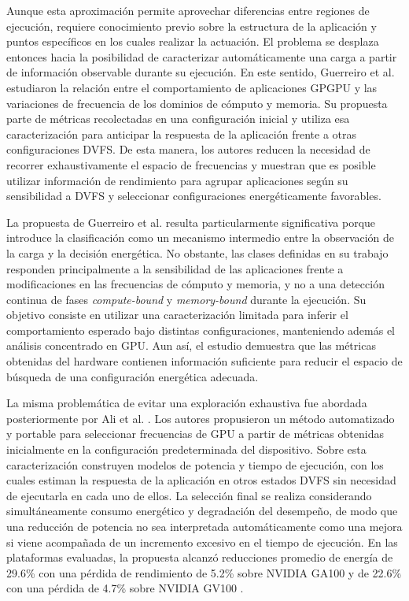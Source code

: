 Aunque esta aproximación permite aprovechar diferencias entre regiones de ejecución, requiere conocimiento previo sobre la estructura de la aplicación y puntos específicos en los cuales realizar la actuación. El problema se desplaza entonces hacia la posibilidad de caracterizar automáticamente una carga a partir de información observable durante su ejecución. En este sentido, Guerreiro et al. \cite{Guerreiro2019} estudiaron la relación entre el comportamiento de aplicaciones GPGPU y las variaciones de frecuencia de los dominios de cómputo y memoria. Su propuesta parte de métricas recolectadas en una configuración inicial y utiliza esa caracterización para anticipar la respuesta de la aplicación frente a otras configuraciones DVFS. De esta manera, los autores reducen la necesidad de recorrer exhaustivamente el espacio de frecuencias y muestran que es posible utilizar información de rendimiento para agrupar aplicaciones según su sensibilidad a DVFS y seleccionar configuraciones energéticamente favorables.

La propuesta de Guerreiro et al. \cite{Guerreiro2019} resulta particularmente significativa porque introduce la clasificación como un mecanismo intermedio entre la observación de la carga y la decisión energética. No obstante, las clases definidas en su trabajo responden principalmente a la sensibilidad de las aplicaciones frente a modificaciones en las frecuencias de cómputo y memoria, y no a una detección continua de fases \textit{compute-bound} y \textit{memory-bound} durante la ejecución. Su objetivo consiste en utilizar una caracterización limitada para inferir el comportamiento esperado bajo distintas configuraciones, manteniendo además el análisis concentrado en GPU. Aun así, el estudio demuestra que las métricas obtenidas del hardware contienen información suficiente para reducir el espacio de búsqueda de una configuración energética adecuada.

La misma problemática de evitar una exploración exhaustiva fue abordada posteriormente por Ali et al. \cite{Ali2023}. Los autores propusieron un método automatizado y portable para seleccionar frecuencias de GPU a partir de métricas obtenidas inicialmente en la configuración predeterminada del dispositivo. Sobre esta caracterización construyen modelos de potencia y tiempo de ejecución, con los cuales estiman la respuesta de la aplicación en otros estados DVFS sin necesidad de ejecutarla en cada uno de ellos. La selección final se realiza considerando simultáneamente consumo energético y degradación del desempeño, de modo que una reducción de potencia no sea interpretada automáticamente como una mejora si viene acompañada de un incremento excesivo en el tiempo de ejecución. En las plataformas evaluadas, la propuesta alcanzó reducciones promedio de energía de 29.6\% con una pérdida de rendimiento de 5.2\% sobre NVIDIA GA100 y de 22.6\% con una pérdida de 4.7\% sobre NVIDIA GV100 \cite{Ali2023}.

